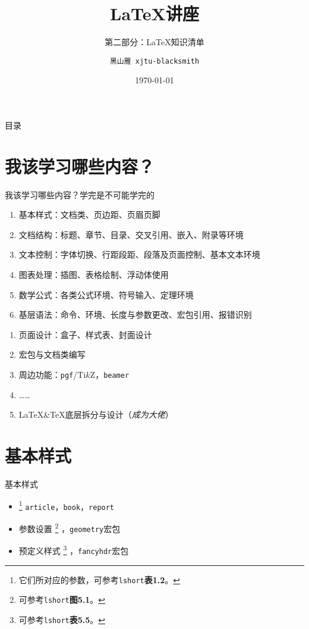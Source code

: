 \documentclass[10pt]{beamer}
\title[钱学森书院学业辅导中心]{\LaTeX 讲座}
\subtitle{第二部分：\LaTeX 知识清单}
\author[黑山雁]{\texttt{黑山雁 xjtu-blacksmith}}
\institute[Xi'an Jiaotong University]
{\textbf{西安交通大学·钱学森书院学业辅导中心}}
\date{\today}
\begin{document}
\begin{frame}
  \titlepage
\end{frame}

\begin{frame}{目录}
  \tableofcontents
\end{frame}

\section{我该学习哪些内容？}
\begin{frame}{我该学习哪些内容？}{学完是不可能学完的}
\begin{enumerate}
    \item 基本样式：文档类、页边距、页眉页脚
    \item 文档结构：标题、章节、目录、交叉引用、嵌入、附录等环境
    \item 文本控制：字体切换、行距段距、段落及页面控制、基本文本环境
    \item 图表处理：插图、表格绘制、浮动体使用
    \item 数学公式：各类公式环境、符号输入、定理环境
    \item 基层语法：命令、环境、长度与参数更改、宏包引用、报错识别
\end{enumerate}

\begin{enumerate}
    \item 页面设计：盒子、样式表、封面设计
    \item 宏包与文档类编写
    \item 周边功能：\texttt{pgf}/Ti$k$Z，\texttt{beamer}
    \item ……
    \item \LaTeX\&\TeX 底层拆分与设计（\textit{成为大佬}）
\end{enumerate}
\end{frame}

\section{基本样式}
\begin{frame}{基本样式}
\begin{itemize}
    \item {}
    \footnote{它们所对应的参数，可参考\texttt{lshort}\textbf{表1.2}。}
    \texttt{article}，\texttt{book}，\texttt{report}
    \item {}参数设置
    \footnote{可参考\texttt{lshort}\textbf{图5.1}。}
    ，\texttt{geometry}宏包
    \item {}预定义样式
    \footnote{可参考\texttt{lshort}\textbf{表5.5}。}
    ，\texttt{fancyhdr}宏包
\end{itemize}
\end{frame}
\end{document}
